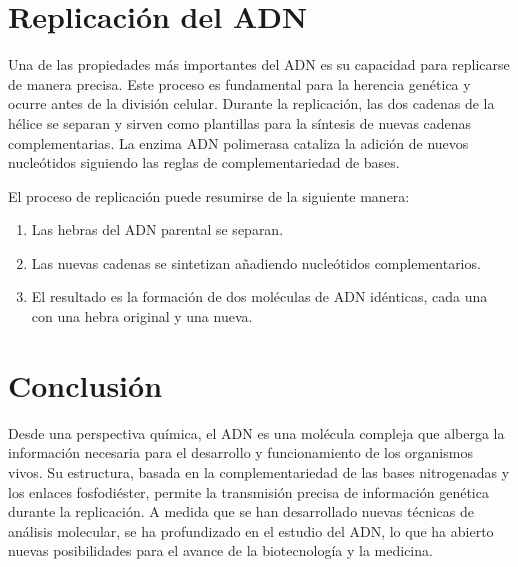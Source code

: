 \section{Replicación del ADN}

Una de las propiedades más importantes del ADN es su capacidad para replicarse de manera precisa. Este proceso es fundamental para la herencia genética y ocurre antes de la división celular. Durante la replicación, las dos cadenas de la hélice se separan y sirven como plantillas para la síntesis de nuevas cadenas complementarias. La enzima ADN polimerasa cataliza la adición de nuevos nucleótidos siguiendo las reglas de complementariedad de bases.

El proceso de replicación puede resumirse de la siguiente manera:

\begin{enumerate}
\item Las hebras del ADN parental se separan.
\item Las nuevas cadenas se sintetizan añadiendo nucleótidos complementarios.
\item El resultado es la formación de dos moléculas de ADN idénticas, cada una con una hebra original y una nueva.
\end{enumerate}

\section{Conclusión}

Desde una perspectiva química, el ADN es una molécula compleja que alberga la información necesaria para el desarrollo y funcionamiento de los organismos vivos. Su estructura, basada en la complementariedad de las bases nitrogenadas y los enlaces fosfodiéster, permite la transmisión precisa de información genética durante la replicación. A medida que se han desarrollado nuevas técnicas de análisis molecular, se ha profundizado en el estudio del ADN, lo que ha abierto nuevas posibilidades para el avance de la biotecnología y la medicina.


